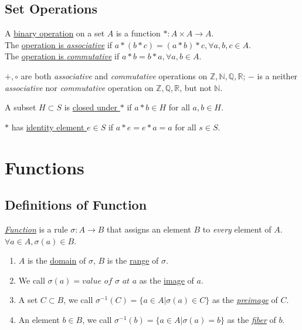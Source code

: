 \documentclass[11pt]{elegantbook}
\begin{document}
\subsection{Set Operations}
\begin{definition}
    \normalfont
    A \underline{binary operation} on a set $A$ is a function $*:A\times A \rightarrow A$.\\
    The \underline{operation is \textit{associative}} if $a*(b*c)=(a*b)*c, \forall a,b,c\in A$.\\
    The \underline{operation is \textit{commutative}} if $a*b=b*a, \forall a,b\in A$.
\end{definition}

\begin{example}

${+,\circ}$ are both \textit{associative} and \textit{commutative} operations on $\mathbb{Z},\mathbb{N},\mathbb{Q},\mathbb{R}$; $-$ is a neither \textit{associative} nor \textit{commutative} operation on $\mathbb{Z},\mathbb{Q},\mathbb{R}$, but not $\mathbb{N}$.
\end{example}

\begin{definition}
A subset $H\subset S$ is \underline{closed under $*$} if $a*b\in H$ for all $a,b\in H$.
\end{definition}

\begin{definition}
$*$ has \underline{identity element $e\in S$} if $a*e=e*a=a$ for all $s\in S$.
\end{definition}






\section{Functions}
\subsection{Definitions of Function}
\begin{definition}[Function]
\normalfont
\underline{\textit{Function}} is a rule $\sigma:A\rightarrow B$ that assigns an element $B$ to \textit{every} element of $A$. $\forall a\in A, \sigma(a)\in B$.
\begin{enumerate}
    \item $A$ is the \underline{domain} of $\sigma$, $B$ is the \underline{range} of $\sigma$.
    \item We call $\sigma (a)= \textit{value of } \sigma\textit{ at } a$ as the \underline{image} of $a$.
    \item A set $C\subset B$, we call $\sigma^{-1}(C)=\{a\in A| \sigma(a)\in C\}$ as the \textit{\underline{preimage}} of $C$.
    \item An element $b\in B$, we call $\sigma^{-1}(b)=\{a\in A| \sigma(a)=b \}$ as the \textit{\underline{fiber}} of $b$.
\end{enumerate}
\end{definition}
\end{document}
